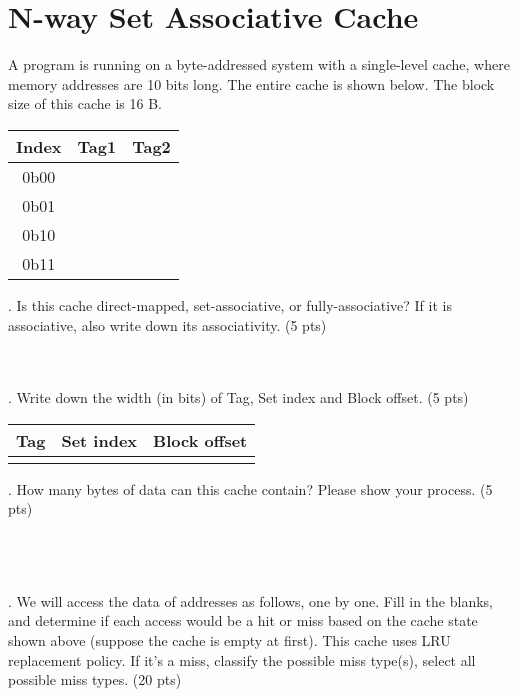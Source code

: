 \documentclass{article}
\begin{document}
\section{N-way Set Associative Cache}
\noindent A program is running on a byte-addressed system with a single-level cache, where memory addresses are 10 bits long. The entire cache is shown below. The block size of this cache is 16 B.\par
\begin{table}[h!]
\centering
\setlength{\tabcolsep}{5mm}
\begin{tabular}{|c|c|c|}
\hline
Index & Tag1 & Tag2  \\\hline
0b00 &  &  \\ \hline
0b01 &  &  \\ \hline
0b10 &  &  \\ \hline
0b11 &  &  \\ \hline
\end{tabular}
\end{table}
. Is this cache direct-mapped, set-associative, or fully-associative? If it is associative, also write down its associativity.{\color{red} (5 pts)}\par
~\\
~\\
. Write down the width (in bits) of Tag, Set index and Block offset.{\color{red} (5 pts)}\par
\begin{table}[h!]
\centering
\renewcommand{\arraystretch}{1.6}
\setlength{\tabcolsep}{5mm}
\begin{tabular}{|c|c|c|}
\hline
Tag & Set index & Block offset  \\\hline
  &   &   \\ \hline
\end{tabular}
\end{table}
. How many bytes of data can this cache contain? Please show your process.{\color{red} (5 pts)} \par
~\\
~\\
~\\
. We will access the data of addresses as follows, one by one. Fill in the blanks, and determine if each access would be a hit or miss based on the cache state shown above (suppose the cache is empty at first). This cache uses LRU replacement policy. If it’s a miss, classify the possible miss type(s), select all possible miss types.{\color{red} (20 pts)}\par
\end{document}
